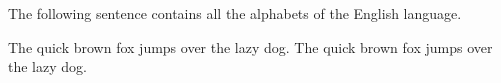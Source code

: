 \documentclass{article}
\begin{document}
	
	The following sentence contains all the alphabets of the English language.
	
	\calligra
	The quick brown fox jumps over the lazy dog.
	\punkfamily
	The quick brown fox jumps over the lazy dog.
	
\end{document}
